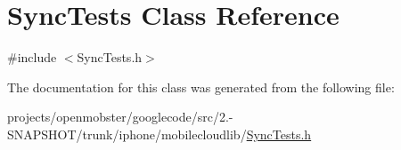\hypertarget{interface_sync_tests}{
\section{\-Sync\-Tests \-Class \-Reference}
\label{interface_sync_tests}
}


{\ttfamily \#include $<$\-Sync\-Tests.\-h$>$}



\-The documentation for this class was generated from the following file\-:\begin{DoxyCompactItemize}
\item 
projects/openmobster/googlecode/src/2.-\/\-S\-N\-A\-P\-S\-H\-O\-T/trunk/iphone/mobilecloudlib/\hyperlink{_sync_tests_8h}{\-Sync\-Tests.\-h}\end{DoxyCompactItemize}
